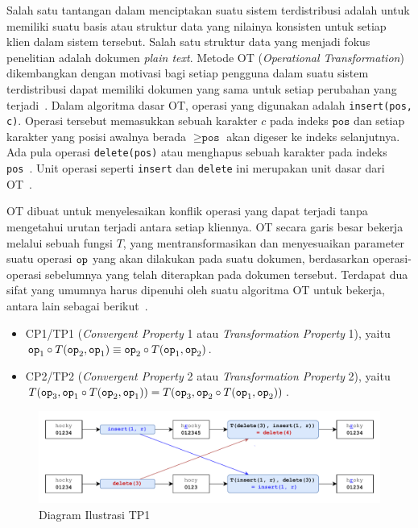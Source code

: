 Salah satu tantangan dalam menciptakan suatu sistem terdistribusi adalah untuk memiliki suatu basis atau struktur data yang nilainya konsisten untuk setiap klien dalam sistem tersebut. Salah satu struktur data yang menjadi fokus penelitian adalah dokumen \textit{plain text}. Metode OT (\textit{Operational Transformation}) dikembangkan dengan motivasi bagi setiap pengguna dalam suatu sistem terdistribusi dapat memiliki dokumen yang sama untuk setiap perubahan yang terjadi~\citep{Sun1998}. Dalam algoritma dasar OT, operasi yang digunakan adalah \texttt{insert(pos, c)}. Operasi tersebut memasukkan sebuah karakter $c$ pada indeks $\texttt{pos}$ dan setiap karakter yang posisi awalnya berada $\geq \texttt{pos}$ akan digeser ke indeks selanjutnya. Ada pula operasi \texttt{delete(pos)} atau menghapus sebuah karakter pada indeks \texttt{pos}~\citep{OTOverview1}. Unit operasi seperti \texttt{insert} dan \texttt{delete} ini merupakan unit dasar dari OT~\citep{OTOverview1}.

OT dibuat untuk menyelesaikan konflik operasi yang dapat terjadi tanpa mengetahui urutan terjadi antara setiap kliennya. OT secara garis besar bekerja melalui sebuah fungsi $T$, yang mentransformasikan dan menyesuaikan parameter suatu operasi $\texttt{op}$ yang akan dilakukan pada suatu dokumen, berdasarkan operasi-operasi sebelumnya yang telah diterapkan pada dokumen tersebut. Terdapat dua sifat yang umumnya harus dipenuhi oleh suatu algoritma OT untuk bekerja, antara lain sebagai berikut~\citep{crdtLecture, OTOverview1, Li2004, Ressel1996}.

\begin{itemize}
    \item CP1/TP1 (\textit{Convergent Property} 1 atau \textit{Transformation Property} 1), yaitu $\texttt{op}_1 \circ T(\texttt{op}_2, \texttt{op}_1) \equiv \texttt{op}_2 \circ T(\texttt{op}_1, \texttt{op}_2)$.
    \item CP2/TP2 (\textit{Convergent Property} 2 atau \textit{Transformation Property} 2), yaitu $T(\texttt{op}_{3},\texttt{op}_{1}\circ T(\texttt{op}_{2},\texttt{op}_{1}))=T(\texttt{op}_{3},\texttt{op}_{2}\circ T(\texttt{op}_{1},\texttt{op}_{2}))$.
\end{itemize}


\begin{figure}[h]
    \centering
    \includegraphics[scale=0.8]{assets/skripsi/OT}
    \caption{Diagram Ilustrasi TP1}
    \label{fig:OTschema}
\end{figure}

